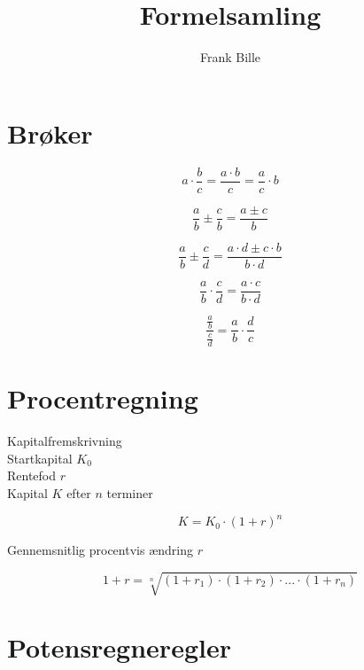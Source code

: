 \documentclass[11pt,a4paper,landscape,twocolumn,fleqn,leqno]{article}
\author{Frank Bille}
\title{Formelsamling}
\begin{document}
\setcounter{tocdepth}{1}
\tableofcontents

\newpage

\setlength{\parindent}{0mm}

\section{Brøker}

\begin{equation}
a \cdot \frac{b}{c} = \frac{a \cdot b}{c} = \frac{a}{c} \cdot b
\end{equation}

\begin{equation}
\frac{a}{b} \pm \frac{c}{b} = \frac{a \pm c}{b}
\end{equation}

\begin{equation}
\frac{a}{b} \pm \frac{c}{d} = \frac{a \cdot d \pm c \cdot b}{b \cdot d}
\end{equation}

\begin{equation}
\frac{a}{b} \cdot \frac{c}{d} = \frac{a \cdot c}{b \cdot d}
\end{equation}

\begin{equation}
\frac{\frac{a}{b}}{\frac{c}{d}} = \frac{a}{b} \cdot \frac{d}{c}
\end{equation}

\section{Procentregning}

Kapitalfremskrivning \\
Startkapital $K_0$ \\
Rentefod $r$ \\
Kapital $K$ efter $n$ terminer

\begin{equation}
K = K_{0} \cdot \left(1+r\right)^{n}
\end{equation}

Gennemsnitlig procentvis ændring $r$

\begin{equation}
1+r = \sqrt[n]{\left(1+r_{1}\right) \cdot \left(1+r_{2}\right) \cdot ... \cdot \left(1+r_{n}\right)}
\end{equation} 

\section{Potensregneregler}
\end{document}
